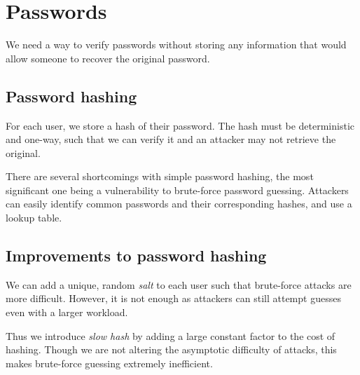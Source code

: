 \section{Passwords}
We need a way to verify passwords without storing any information that would allow someone to recover the original password.

\subsection{Password hashing}
For each user, we store a hash of their password. The hash must be deterministic and one-way, such that we can verify it and an attacker may not retrieve the original. 

\medskip

There are several shortcomings with simple password hashing, the most significant one being a vulnerability to brute-force password guessing. Attackers can easily identify common passwords and their corresponding hashes, and use a lookup table.

\subsection{Improvements to password hashing}
We can add a unique, random \emph{salt} to each user such that brute-force attacks are more difficult. However, it is not enough as attackers can still attempt guesses even with a larger workload. 

\medskip
Thus we introduce \emph{slow hash} by adding a large constant factor to the cost of hashing. Though we are not altering the asymptotic difficulty of attacks, this makes brute-force guessing extremely inefficient.

